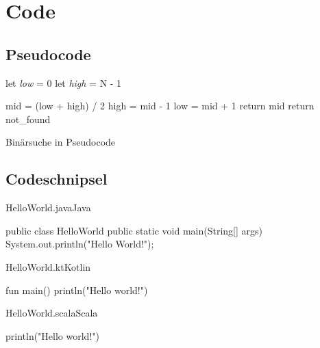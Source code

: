 \chapter{Code}

\section{Pseudocode}

\begin{algorithm}[H]
  let \textit{low} = 0
  let \textit{high} = N - 1
  
  {
    mid = (low + high) / 2\;
    {
      high = mid - 1\;
    }
    {
      {
	low = mid + 1\;
      }
      {
	return mid\;
      }
    }
    return not\_found\;
  }
  \label{binary_search}
  \caption{Binärsuche in Pseudocode}
\end{algorithm}

\clearpage

\section{Codeschnipsel}

\begin{codeblock}{HelloWorld.java}{Java}
  \begin{javacode}
    public class HelloWorld {
      public static void main(String[] args) {
        System.out.println("Hello World!");
      }
    }
  \end{javacode}
\end{codeblock}

\begin{codeblock}{HelloWorld.kt}{Kotlin}
  \begin{kotlincode}
    fun main() {
      println("Hello world!")
    }
  \end{kotlincode}
\end{codeblock}

\begin{codeblock}{HelloWorld.scala}{Scala}
  \begin{scalacode}
    println("Hello world!")
  \end{scalacode}
\end{codeblock}

